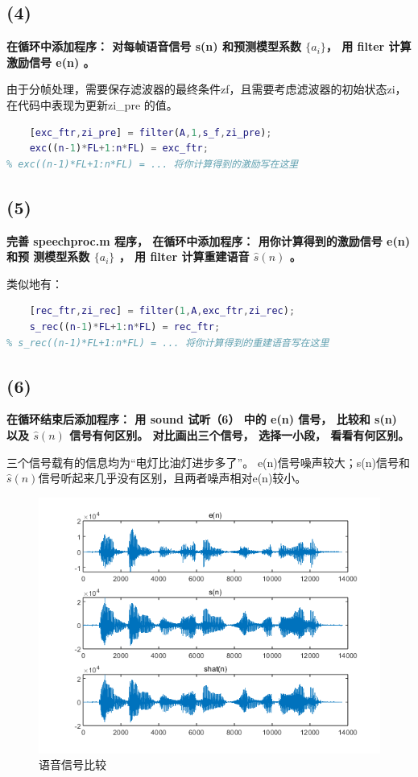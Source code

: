 \documentclass[10pt]{article}
\begin{document}
\subsection*{(4)}
\textbf{在循环中添加程序： 对每帧语音信号 s(n) 和预测模型系数 $\{a_i\} $， 用 filter 计算
激励信号 e(n) 。}

由于分帧处理，需要保存滤波器的最终条件zf，且需要考虑滤波器的初始状态zi，在代码中表现为更新zi\_pre
的值。
\begin{lstlisting}[language=matlab]
% (4) 在此位置写程序，用filter函数s_f计算激励，注意保持滤波器状态
    [exc_ftr,zi_pre] = filter(A,1,s_f,zi_pre);
    exc((n-1)*FL+1:n*FL) = exc_ftr;
% exc((n-1)*FL+1:n*FL) = ... 将你计算得到的激励写在这里
\end{lstlisting}
\subsection*{(5)}
\textbf{完善 speechproc.m 程序， 在循环中添加程序： 用你计算得到的激励信号 e(n) 和预
测模型系数 $\{a_i\} $ ， 用 filter 计算重建语音 $\hat{s}(n)$ 。}

类似地有：
\begin{lstlisting}[language=matlab]
% (5) 在此位置写程序，用filter函数和exc重建语音，注意保持滤波器状态
    [rec_ftr,zi_rec] = filter(1,A,exc_ftr,zi_rec);
    s_rec((n-1)*FL+1:n*FL) = rec_ftr;
% s_rec((n-1)*FL+1:n*FL) = ... 将你计算得到的重建语音写在这里
\end{lstlisting}

\subsection*{(6)}
\textbf{在循环结束后添加程序： 用 sound 试听（6） 中的 e(n) 信号， 比较和 s(n) 以及 $\hat{s}(n)$
信号有何区别。 对比画出三个信号， 选择一小段， 看看有何区别。}

三个信号载有的信息均为“电灯比油灯进步多了”。
e(n)信号噪声较大；s(n)信号和$\hat{s}(n)$信号听起来几乎没有区别，且两者噪声相对e(n)较小。
\begin{figure}[h]
	\centering
	\begin{minipage}{0.49\linewidth}
		\centering
		\includegraphics[width=0.9\linewidth]{compare.png}
		\caption{语音信号比较}
	\end{minipage}
\end{figure}
\end{document}
